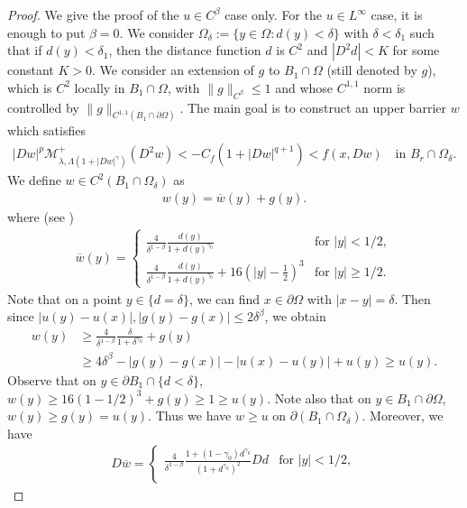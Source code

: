 \documentclass[reqno]{amsart}
\theoremstyle{plain}
\theoremstyle{definition}
\theoremstyle{remark}
\numberwithin{equation}{section}
\begin{document}
\begin{proof}
    We give the proof of the $u \in C^\beta$ case only.
    For the $u \in L^\infty$ case, it is enough to put $\beta=0$.
    We consider $\Omega_{\delta}:=\{y \in \Omega : d(y) <\delta\}$ with $\delta<\delta_1$ such that if $d(y) <\delta_1$, then the distance function $d$ is $C^2$ and $|D^2d| <K$ for some constant $K>0$.
    We consider an extension of $g$ to $B_1\cap\Omega$ (still denoted by $g$), which is $C^2$ locally in $B_1\cap\Omega$, with $\|g\|_{C^\beta}\le 1$ and whose $C^{1,1}$ norm is controlled by $\|g\|_{C^{1,1}(B_1\cap\partial\Omega)}$.
    The main goal is to construct an upper barrier $w$ which satisfies
    \begin{align*}
    |Dw|^p\mathcal{M}^+_{\lambda,\Lambda(1 + |Dw|^\gamma)}(D^2w) < -C_f(1+|Dw|^{q+1}) < f(x,Dw) \quad \text{in }B_r\cap\Omega_\delta.
    \end{align*}
    We define $w \in C^2(B_1 \cap \Omega_\delta)$ as
    \begin{align*}
        w(y) = \overline{w}(y) + g(y). 
    \end{align*}
    where (see \cite{Birindelli14})
    \begin{align} \label{barw}
		\overline{w}(y)=
		\begin{cases} 
		\frac{4}{\delta^{1-\beta}}\frac{d(y)}{1+d(y)^{\gamma_0}} & \text{for $|y|<1/2$},\\
		\frac{4}{\delta^{1-\beta}}\frac{d(y)}{1+d(y)^{\gamma_0}}+16(|y|-\frac{1}{2})^3 & \text{for $|y| \geq 1/2$}.
		\end{cases}
	\end{align}
    Note that on a point $y\in \{d=\delta\}$, we can find $x \in \partial\Omega$ with $|x-y| = \delta$. Then since $|u(y)-u(x)|,|g(y)-g(x)| \leq 2\delta^\beta$, we obtain
    \begin{align*}
        w(y) &\geq \frac{4}{\delta^{1-\beta}}\frac{\delta}{1+\delta^{\gamma_0}} + g(y) \\ &\geq 4\delta^\beta -|g(y)-g(x)| - |u(x)-u(y)| + u(y) \geq u(y).
    \end{align*}
    Observe that on $y \in \partial B_1\cap\{d<\delta\}$, $w(y) \geq 16(1-1/2)^3 +g(y)\geq 
 1\geq u(y)$. Note also that on $y \in B_1 \cap \partial\Omega$, $w(y)  \geq g(y) =u(y)$.
    Thus we have $w \geq u$ on $\partial(B_1\cap \Omega_\delta)$. Moreover, we have
    \begin{align*}
        D\overline{w}=
		\begin{cases} 
		\frac{4}{\delta^{1-\beta}}\frac{1+(1-\gamma_0)d^{\gamma_0}}{(1+d^{\gamma_0})^2} Dd & \text{for $|y|<1/2$},\\

\end{cases}
\end{align*}
\end{proof}
\end{document}

